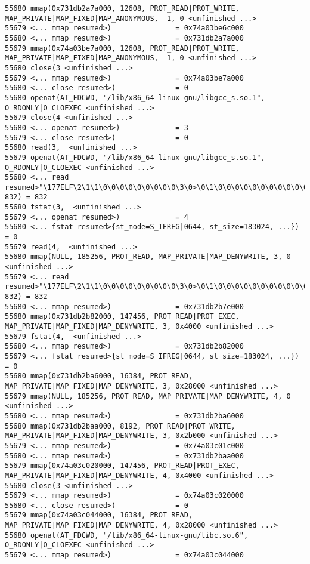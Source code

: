 \begin{verbatim}
55680 mmap(0x731db2a7a000, 12608, PROT_READ|PROT_WRITE, MAP_PRIVATE|MAP_FIXED|MAP_ANONYMOUS, -1, 0 <unfinished ...>
55679 <... mmap resumed>)               = 0x74a03be6c000
55680 <... mmap resumed>)               = 0x731db2a7a000
55679 mmap(0x74a03be7a000, 12608, PROT_READ|PROT_WRITE, MAP_PRIVATE|MAP_FIXED|MAP_ANONYMOUS, -1, 0 <unfinished ...>
55680 close(3 <unfinished ...>
55679 <... mmap resumed>)               = 0x74a03be7a000
55680 <... close resumed>)              = 0
55680 openat(AT_FDCWD, "/lib/x86_64-linux-gnu/libgcc_s.so.1", O_RDONLY|O_CLOEXEC <unfinished ...>
55679 close(4 <unfinished ...>
55680 <... openat resumed>)             = 3
55679 <... close resumed>)              = 0
55680 read(3,  <unfinished ...>
55679 openat(AT_FDCWD, "/lib/x86_64-linux-gnu/libgcc_s.so.1", O_RDONLY|O_CLOEXEC <unfinished ...>
55680 <... read resumed>"\177ELF\2\1\1\0\0\0\0\0\0\0\0\0\3\0>\0\1\0\0\0\0\0\0\0\0\0\0\0"..., 832) = 832
55680 fstat(3,  <unfinished ...>
55679 <... openat resumed>)             = 4
55680 <... fstat resumed>{st_mode=S_IFREG|0644, st_size=183024, ...}) = 0
55679 read(4,  <unfinished ...>
55680 mmap(NULL, 185256, PROT_READ, MAP_PRIVATE|MAP_DENYWRITE, 3, 0 <unfinished ...>
55679 <... read resumed>"\177ELF\2\1\1\0\0\0\0\0\0\0\0\0\3\0>\0\1\0\0\0\0\0\0\0\0\0\0\0"..., 832) = 832
55680 <... mmap resumed>)               = 0x731db2b7e000
55680 mmap(0x731db2b82000, 147456, PROT_READ|PROT_EXEC, MAP_PRIVATE|MAP_FIXED|MAP_DENYWRITE, 3, 0x4000 <unfinished ...>
55679 fstat(4,  <unfinished ...>
55680 <... mmap resumed>)               = 0x731db2b82000
55679 <... fstat resumed>{st_mode=S_IFREG|0644, st_size=183024, ...}) = 0
55680 mmap(0x731db2ba6000, 16384, PROT_READ, MAP_PRIVATE|MAP_FIXED|MAP_DENYWRITE, 3, 0x28000 <unfinished ...>
55679 mmap(NULL, 185256, PROT_READ, MAP_PRIVATE|MAP_DENYWRITE, 4, 0 <unfinished ...>
55680 <... mmap resumed>)               = 0x731db2ba6000
55680 mmap(0x731db2baa000, 8192, PROT_READ|PROT_WRITE, MAP_PRIVATE|MAP_FIXED|MAP_DENYWRITE, 3, 0x2b000 <unfinished ...>
55679 <... mmap resumed>)               = 0x74a03c01c000
55680 <... mmap resumed>)               = 0x731db2baa000
55679 mmap(0x74a03c020000, 147456, PROT_READ|PROT_EXEC, MAP_PRIVATE|MAP_FIXED|MAP_DENYWRITE, 4, 0x4000 <unfinished ...>
55680 close(3 <unfinished ...>
55679 <... mmap resumed>)               = 0x74a03c020000
55680 <... close resumed>)              = 0
55679 mmap(0x74a03c044000, 16384, PROT_READ, MAP_PRIVATE|MAP_FIXED|MAP_DENYWRITE, 4, 0x28000 <unfinished ...>
55680 openat(AT_FDCWD, "/lib/x86_64-linux-gnu/libc.so.6", O_RDONLY|O_CLOEXEC <unfinished ...>
55679 <... mmap resumed>)               = 0x74a03c044000

\end{verbatim}

